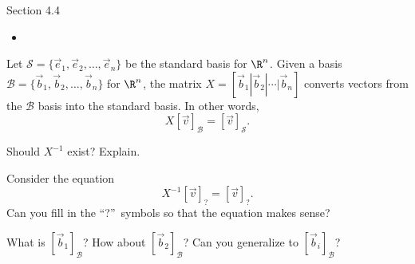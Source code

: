 \documentclass{problemset}
\begin{document}
	
\begin{lesson}
	\newpage

	Section 4.4

	\begin{itemize}
		\item 
	\end{itemize}


	\newpage
\end{lesson}
	\question
	Let $\mathcal S=\{\vec e_1,\vec e_2,\ldots,\vec e_n\}$ be the standard basis for $\R^n$.
	Given a basis $\mathcal B=\{\vec b_1,\vec b_2,\ldots,\vec b_n\}$ for $\R^n$, the 
	matrix $X=[\vec b_1|\vec b_2|\cdots|\vec b_n]$ converts
	vectors from the $\mathcal B$ basis into the standard basis. In other words,
	\[
		X[\vec v]_{\mathcal B} = [\vec v]_{\mathcal S}.
	\]
	\begin{parts}
		\item Should $X^{-1}$ exist? Explain.
		\item Consider the equation\[
				X^{-1}[\vec v]_{?} = [\vec v]_{?}.
			\]
			Can you fill in the ``?''~symbols so that the equation makes sense?
		\item What is $[\vec b_1]_{\mathcal B}$?  How about $[\vec b_2]_{\mathcal B}$?  Can
			you generalize to $[\vec b_i]_{\mathcal B}$?
	\end{parts}
\end{document}
